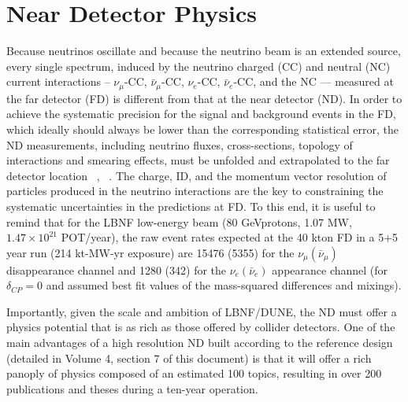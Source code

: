 
\chapter{Near Detector Physics}
\label{ch:physics-nd}


Because neutrinos oscillate and because the neutrino beam is an extended  source, every single 
spectrum,  induced by the neutrino charged (CC) and neutral (NC) current interactions -- $\nu_\mu$-CC, 
$\bar \nu_\mu$-CC, $\nu_e$-CC, $\bar \nu_e$-CC, and the NC --- measured at the far detector (FD)  is different from that at the near detector (ND). 
In order to achieve the systematic precision for the signal and background events  in the FD,  
which ideally should always be lower than the corresponding statistical error, the ND 
measurements,  including neutrino fluxes,  cross-sections, topology of 
interactions and smearing effects, must be unfolded and extrapolated to the far detector location 
~\cite{ND-REQ1}, ~\cite{ND-REQ2}.  The charge, ID,  and the momentum vector resolution of 
particles produced in the neutrino interactions  are the key to constraining  the systematic 
uncertainties in the predictions at FD. 
%
%
To this end, it is useful to remind that for the LBNF low-energy beam 
(80 GeVprotons, 1.07 MW, $1.47 \times 10^{21} $ POT/year), the raw event rates expected at the  
40 kton FD in a 5+5 year run (214 kt-MW-yr exposure) are 15476 (5355) for 
the $\nu_\mu (\bar \nu_\mu)$ disappearance channel 
and 1280 (342) for the $\nu_e(\bar \nu_e)$ appearance channel (for $\delta_{CP}=0$ and assumed 
best fit values of the mass-squared differences and mixings). 


\noindent
Importantly, given the scale and ambition of LBNF/DUNE, the ND must offer a physics 
potential that is as rich as those offered by collider detectors. 
One of the main advantages of a high resolution ND built according to the reference design 
(detailed in Volume 4, section 7 of  this document) is that it will offer a rich panoply of physics composed 
of an estimated 100 topics,  resulting in over 200 publications and  theses during a ten-year operation. 

